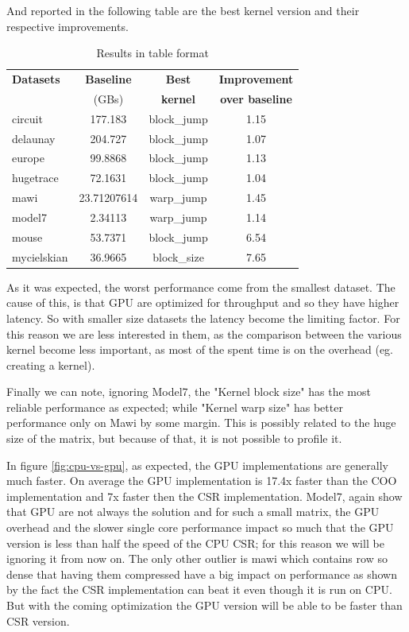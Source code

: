 \documentclass[conference]{IEEEtran}
\begin{document}
And reported in the following table are the best kernel version and their respective improvements.

\begin{table}[h!]
	\centering
	\begin{adjustbox}{width=0.9\columnwidth}
		\begin{tabular}{lccc}
			\toprule
			\textbf{Datasets} & \textbf{Baseline } &\textbf{Best } & \textbf{Improvement }\\
			& (GBs) & \textbf{kernel} & \textbf{over baseline} \\
			\midrule
			circuit &177.183& block\_jump & 1.15  \\
			delaunay &204.727 & block\_jump & 1.07 \\
			europe & 99.8868& block\_jump & 1.13  \\
			hugetrace &72.1631 & block\_jump & 1.04  \\
			mawi &23.71207614 & warp\_jump & 1.45  \\
			model7 &2.34113 & warp\_jump & 1.14 \\
			mouse & 53.7371&  block\_jump & 6.54  \\
			mycielskian& 36.9665& block\_size & 7.65 \\
		\end{tabular}
	\end{adjustbox}

	\caption{Results in table format}
	\label{tab:gpu-results}
\end{table}

\FloatBarrier
As it was expected, the worst performance come from the smallest dataset. The cause of this, is that GPU are optimized for throughput and so they have higher latency. So with smaller size datasets the latency become the limiting factor. For this reason we are less interested in them, as the comparison between the various kernel become less important, as most of the spent time is on the overhead (eg. creating a kernel).



Finally we can note, ignoring Model7, the "Kernel block size" has the most reliable performance as expected; while "Kernel warp size" has better performance only on Mawi by some margin. This is possibly related to the huge size of the matrix, but because of that, it is not possible to profile it.

In figure \ref{fig:cpu-vs-gpu}, as expected, the GPU implementations are generally much faster. On average the GPU implementation is 17.4x faster than the COO implementation and 7x faster then the CSR implementation. Model7, again show that GPU are not always the solution and for such a small matrix, the GPU overhead and the slower single core performance impact so much that the GPU version is less than half the speed of the CPU CSR; for this reason we will be ignoring it from now on. The only other outlier is mawi which contains row so dense that having them compressed have a big impact on performance as shown by the fact the CSR implementation can beat it even though it is run on CPU. But with the coming optimization the GPU version will be able to be faster than CSR version.
\end{document}
